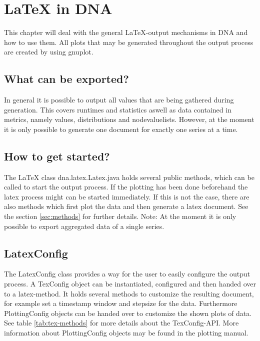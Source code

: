 \chapter{LaTeX in DNA}
This chapter will deal with the general LaTeX-output mechanisms in DNA and how to use them. All plots that may be generated throughout the output process are created by using gnuplot.

\section{What can be exported?}
In general it is possible to output all values that are being gathered during generation. This covers runtimes and statistics aswell as data contained in metrics, namely values, distributions and nodevaluelists. However, at the moment it is only possible to generate one document for exactly one series at a time.

\section{How to get started?}
The LaTeX class dna.latex.Latex.java holds several public methods, which can be called to start the output process. If the plotting has been done beforehand the latex process might can be started immediately. If this is not the case, there are also methods which first plot the data and then generate a latex document. See the section \ref{sec:methods} for further details. Note: At the moment it is only possible to export aggregated data of a single series. 

\section{LatexConfig}
The LatexConfig class provides a way for the user to easily configure the output process. A TexConfig object can be instantiated, configured and then handed over to a latex-method. It holds several methods to customize the resulting document, for example set a timestamp window and stepsize for the data. Furthermore PlottingConfig objects can be handed over to customize the shown plots of data. See table \ref{tab:tex-methods} for more details about the TexConfig-API. More information about PlottingConfig objects may be found in the plotting manual.


